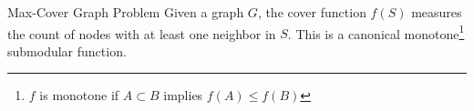 \documentclass{beamer} %
\begin{document}
\begin{frame}{Max-Cover Graph Problem} %
Given a graph $G$, the cover function $f(S)$ measures the count of nodes with at least one neighbor in $S$. This is a canonical monotone\footnote{$f$ is monotone if $A \subset B$ implies $f(A) \leq f(B)$} submodular function.
\begin{figure}[t]
\begin{center}
\begin{tikzpicture}[x=0.75pt,y=0.75pt,yscale=-1,xscale=1]


\end{tikzpicture}
\end{center}
\end{figure}
\end{frame}
\end{document}
